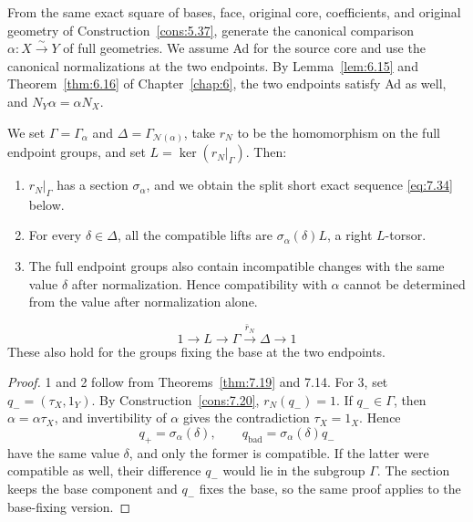\begin{theorem}\label{thm:7.21}

From the same exact square of bases, face, original core, coefficients, and
original geometry of Construction~\ref{cons:5.37}, generate the canonical comparison
$\alpha:X\xrightarrow{\sim}Y$ of full geometries.
We assume Ad for the source core and use the canonical normalizations at the two endpoints.
By Lemma~\ref{lem:6.15} and Theorem~\ref{thm:6.16} of Chapter~\ref{chap:6}, the two
endpoints satisfy Ad as well, and $N_Y\alpha=\alpha N_X$.

We set $\Gamma=\Gamma_\alpha$ and $\Delta=\Gamma_{\mathcal N(\alpha)}$, take
$r_N$ to be the homomorphism on the full endpoint groups, and set $L=\ker(r_N|_\Gamma)$. Then:

\begin{enumerate}
\item $r_N|_\Gamma$ has a section $\sigma_\alpha$, and we obtain the split short exact
sequence \eqref{eq:7.34} below.
\item For every $\delta\in\Delta$, all the compatible lifts are
$\sigma_\alpha(\delta)L$, a right $L$-torsor.
\item The full endpoint groups also contain incompatible changes with the same value
$\delta$ after normalization.
Hence compatibility with $\alpha$ cannot be determined from the value after normalization
alone.
\end{enumerate}
\begin{equation*}
1\longrightarrow L\longrightarrow\Gamma
\xrightarrow{\bar r_N}\Delta\longrightarrow1
\tag{7.34}\label{eq:7.34}
\end{equation*}
These also hold for the groups fixing the base at the two endpoints.

\end{theorem}

\begin{proof}

1 and 2 follow from Theorems~\ref{thm:7.19} and 7.14.
For 3, set $q_-=(\tau_X,1_Y)$. By Construction~\ref{cons:7.20}, $r_N(q_-)=1$.
If $q_-\in\Gamma$, then $\alpha=\alpha\tau_X$, and invertibility of $\alpha$ gives the
contradiction $\tau_X=1_X$.
Hence
\begin{equation*}
q_+=\sigma_\alpha(\delta),\qquad
q_{\mathrm{bad}}=\sigma_\alpha(\delta)q_-
\tag{7.35}\label{eq:7.35}
\end{equation*}
have the same value $\delta$, and only the former is compatible.
If the latter were compatible as well, their difference $q_-$ would lie in the subgroup
$\Gamma$.
The section keeps the base component and $q_-$ fixes the base, so the same proof applies to
the base-fixing version.

\end{proof}


